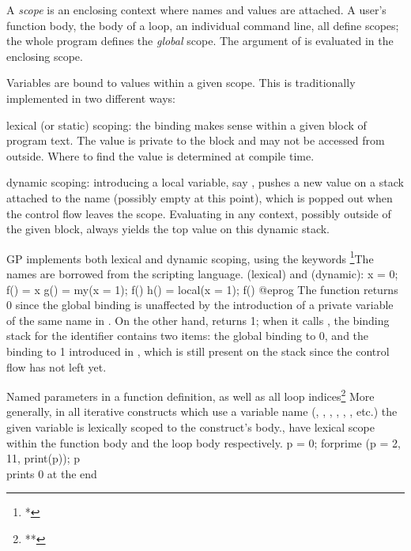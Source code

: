 
A \emph{scope} is an enclosing context where names and values are attached.
A user's function body, the body of a loop, an individual command line, all
define scopes; the whole program defines the \emph{global} scope. The
argument of  is evaluated in the enclosing scope.

Variables are bound to values within a given scope. This is traditionally
implemented in two different ways:

\item{} lexical (or static) scoping: the binding makes
sense within a given block of program text. The value is private to the block
and may not be accessed from outside. Where to find the value is determined
at compile time.

\item{} dynamic scoping: introducing a local variable,
say , pushes a new value on a stack attached to the name 
(possibly empty at this point), which is popped out when the control flow
leaves the scope. Evaluating  in any context, possibly outside of the
given block, always yields the top value on this dynamic stack.

GP implements both lexical and dynamic scoping, using the keywords%
\footnote{*}{The names are borrowed from the  scripting language.}
 (lexical) and  (dynamic):
\bprog
  x = 0;
  f() = x
  g() =    my(x = 1); f()
  h() = local(x = 1); f()
@eprog\noindent
The function  returns 0 since the global  binding
is unaffected by the introduction of a private variable of the same name in
. On the other hand,  returns 1; when it calls , the
binding stack for the  identifier contains two items: the global
binding to 0, and the binding to 1 introduced in , which is still
present on the stack since the control flow has not left  yet.


Named parameters in a function definition, as well as all loop
indices\footnote{**}{
More generally, in all iterative constructs which use a variable name
(, , , , ,
, etc.) the given variable is lexically scoped to the construct's
body.},
have lexical scope within the function body and the loop body respectively.
\bprog
p = 0;
forprime (p = 2, 11, print(p)); p   \\ prints 0 at the end

